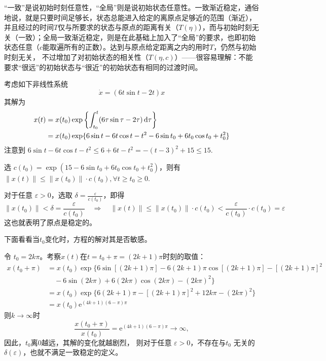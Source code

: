 \begin{note}
  “一致”是说初始时刻任意性，“全局”则是说初始状态任意性。一致渐近稳定，通俗地说，就是只要时间足够长，状态总能进入给定的离原点足够近的范围（渐近），
  并且经过的时间$T$仅与所要求的状态与原点的距离有关（$T(\eta)$），而与初始时刻无关（一致）；全局一致渐近稳定，则是在此基础上加入了“全局”的要求，也即初始状态任意（$c$能取遍所有的正数）。达到与原点给定距离之内的用时$T$，仍然与初始时刻无关，
  不过增加了对初始状态的相关性（$T(\eta,c)$）——很容易理解：不能要求“很远”的初始状态与“很近”的初始状态有相同的过渡时间。
\end{note}
\begin{example}[稳定但不一致稳定]
  考虑如下非线性系统
  \[ \dot{x} = (6 t  \sin  t - 2 t) x \]
  其解为
  \begin{align*}
    x (t) & =  x (t_0) \exp \left\{ \int^t_{t_0} (6 \tau \sin \tau - 2 \tau)
    \mathop{}\!\mathrm{d} \tau \right\}\\
    & =  x (t_0) \exp \{ 6 \sin  t - 6 t  \cos  t - t^2 - 6 \sin  t_0 + 6
    t_0 \cos  t_0 + t^2_0 \}
  \end{align*}
  注意到 $6 \sin  t - 6 t  \cos  t - t^2 \leq 6 + 6 t - t^2 = - (t - 3)^2 + 15
  \leq 15$.
  
  选 $c (t_0) = \exp (15 - 6 \sin  t_0 + 6 t_0 \cos  t_0 + t^2_0)$，则有 $\| x (t) \| \leq \| x (t_0) \| \cdot c (t_0), \forall t
  \geq t_0 \geq 0$.
  
  对于任意 $\varepsilon > 0$，选取 $\delta = \frac{\varepsilon}{c (t_0)}$，即得
  \[ \| x (t_0) \| < \delta = \frac{\varepsilon}{c (t_0)} \quad \Rightarrow
     \quad \| x (t) \| \leq \| x (t_0) \| \cdot c (t_0) < \frac{\varepsilon}{c
     (t_0)} \cdot c (t_0) = \varepsilon \]
  这也就表明了原点是稳定的。
  
  下面看看当$t_0$变化时，方程的解对其是否敏感。

  令 $t_0 = 2 k \pi$。考察$x (t)$在$t = t_0 + \pi = (2 k + 1)\pi$时刻的取值：
  \begin{align*}
    x (t_0 + \pi) & =  x (t_0) \exp \{ 6 \sin [(2 k + 1) \pi] - 6 (2 k + 1)
    \pi \cos [(2 k + 1) \pi] - [(2 k + 1) \pi]^2 \\
    &  \quad - 6 \sin (2 k \pi) + 6 (2 k \pi) \cos (2 k \pi) - (2 k \pi)^2 \} \\
    & =  x (t_0) \exp \{ 6 (2 k + 1) \pi - [(2 k + 1) \pi]^2  + 12 k \pi -
    (2 k \pi)^2 \} \\
    & =  x (t_0) \mathrm{e}^{\left( \text{} 4 k + 1 \right) (6 - \pi) \pi}
  \end{align*}
  则$k \rightarrow\infty$时
  \[ \frac{x (t_0 + \pi)}{x (t_0)} = \mathrm{e}^{\left( \text{} 4 k + 1 \right) (6 -
     \pi) \pi} \rightarrow \infty,  \]
  因此，$t_0$离$0$越远，其解的变化就越剧烈，
  则对于任意 $\varepsilon > 0$，不存在与$t_0$ 无关的$\delta (\varepsilon)$，也就不满足一致稳定的定义。
\end{example}
